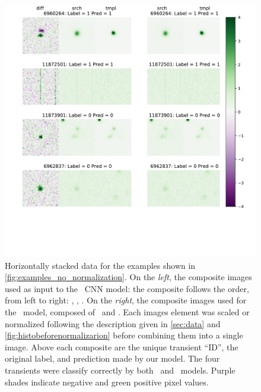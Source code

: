 \begin{figure}
    \centering
    \includegraphics[width=0.7\linewidth]{
    figures/32dex_new_test.pdf}
    \caption{Horizontally stacked data for the examples shown in \autoref{fig:examples_no_normalization}. On the {\it left}, the composite images used as input to the \diabased\ CNN model: the composite follows the order, from left to right: \diff, \search, \temp. On the {\it right}, the composite images used for the \nodia\ model, composed of \search\ and \temp. Each images element was scaled or normalized following the description given in \autoref{sec:data} and \autoref{fig:histobeforenormalizarion} before combining them into a single image. Above each composite are the unique transient ``ID'', the original label, and prediction made by our model. The four transients were classify correctly by both \diabased\ and \nodia\ models. Purple shades indicate negative and green  positive pixel values.
}
    \label{fig:examples_hstack_normalization}
\end{figure}

